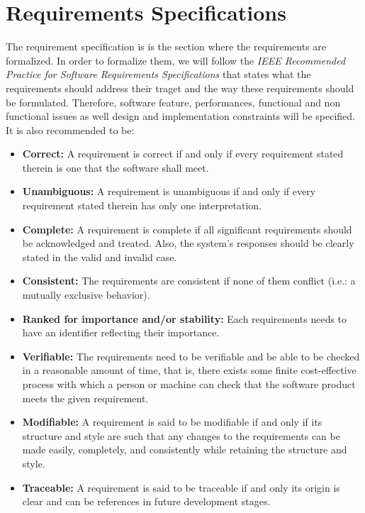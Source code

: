 \section{Requirements Specifications}
The requirement specification is is the section where the requirements are formalized. In order to formalize them, we will follow the \textit{IEEE Recommended Practice for Software Requirements Specifications}\cite{ieee_software_requirement_specification} that states what the requirements should address their traget and the way these requirements should be formulated. Therefore, software feature, performances, functional and non functional issues as well design and implementation constraints will be specified. It is also recommended to be:
\begin{itemize}
\item\textbf{Correct:} A requirement is correct if and only if every requirement stated therein is one that the software shall meet.
\item\textbf{Unambiguous:} A requirement is unambiguous if and only if every requirement stated therein has only one interpretation.
\item\textbf{Complete:} A requirement is complete if all significant requirements should be acknowledged and treated. Also, the system's responses should be clearly stated in the valid and invalid case.
\item\textbf{Consistent:} The requirements are consistent if none of them conflict (i.e.: a mutually exclusive behavior).
\item\textbf{Ranked for importance and/or stability:} Each requirements needs to have an identifier reflecting their importance.
\item\textbf{Verifiable:} The requirements need to be verifiable and be able to be checked in a reasonable amount of time, that is, there exists some finite cost-effective process with which a person or machine can check that
the software product meets the given requirement. 
\item\textbf{Modifiable:} A requirement is said to be modifiable if and only if its structure and style are such that any changes to the requirements can be made easily, completely, and consistently while retaining the structure and style.
\item\textbf{Traceable:} A requirement is said to be traceable if and only its origin is clear and can be references in future development stages.
\end{itemize}


